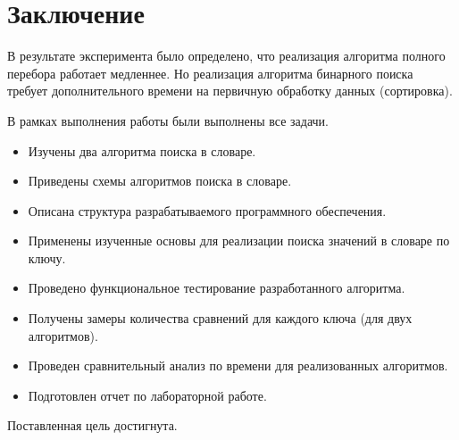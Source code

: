 \chapter*{Заключение}

В результате эксперимента было определено, что реализация алгоритма полного перебора работает медленнее. Но реализация алгоритма бинарного поиска требует дополнительного времени на первичную обработку данных (сортировка).

В рамках выполнения работы были выполнены все задачи.
\begin{itemize}[label = ---]
	\item Изучены два алгоритма поиска в словаре.
	\item Приведены схемы алгоритмов поиска в словаре.
	\item Описана структура разрабатываемого программного обеспечения.
	\item Применены изученные основы для реализации поиска значений в словаре по ключу.
	\item Проведено функциональное тестирование разработанного алгоритма.
	\item Получены замеры количества сравнений для каждого ключа (для двух алгоритмов).
	\item Проведен сравнительный анализ по времени для реализованных алгоритмов.
	\item Подготовлен отчет по лабораторной работе.
\end{itemize}
Поставленная цель достигнута.
